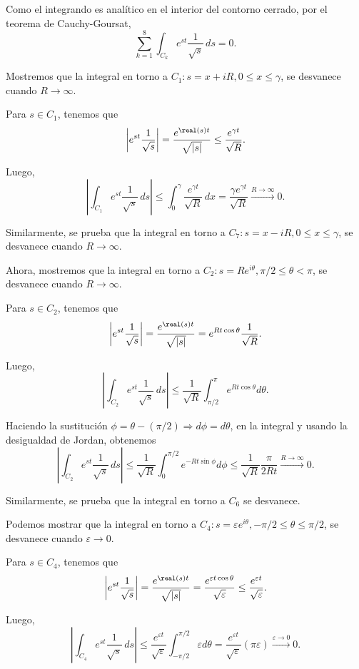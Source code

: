 \begin{ejemplo}
    Como el integrando es analítico en el interior del contorno cerrado, por el teorema de Cauchy-Goursat,
    $$\sum_{k=1}^{8} \int_{C_k} e^{st} \frac{1}{\sqrt{s}} \,ds = 0.$$

    Mostremos que la integral en torno a $C_1: s = x + i R, 0\leq x \leq \gamma$, se desvanece cuando $R \to \infty$. 

    Para $s \in C_1$, tenemos que
    $$\left|e^{st} \frac{1}{\sqrt{s}} \right| = \frac{e^{\real(s) t}}{\sqrt{|s|}} \leq \frac{e^{\gamma t}}{\sqrt{R}}.$$

    Luego,
    $$\left|\int_{C_1} e^{st} \frac{1}{\sqrt{s}} \,ds \right| \leq \int_0^{\gamma} \frac{e^{\gamma t}}{\sqrt{R}} \,dx = \frac{\gamma e^{\gamma t}}{\sqrt{R}} \overset{R \to \infty}{\longrightarrow} 0.$$

    Similarmente, se prueba que la integral en torno a $C_7: s = x - i R, 0 \leq x \leq \gamma$, se desvanece cuando $R \to \infty$.

    Ahora, mostremos que la integral en torno a $C_2: s = Re^{i\theta}, \pi/2 \leq \theta < \pi$, se desvanece cuando $R \to \infty$. 

     Para $s \in C_2$, tenemos que
    $$\left|e^{st} \frac{1}{\sqrt{s}} \right| = \frac{e^{\real(s) t}}{\sqrt{|s|}} = e^{R t \cos \theta }\frac{1}{\sqrt{R}}.$$

    Luego,
    $$\left|\int_{C_2} e^{st} \frac{1}{\sqrt{s}} \,ds \right| \leq \frac{1}{\sqrt{R}} \int_{\pi/2}^{\pi} e^{Rt \cos \theta} d\theta.$$

    Haciendo la sustitución $\phi = \theta - (\pi/2) \Rightarrow d\phi = d\theta$, en la integral y usando la desigualdad de Jordan, obtenemos
    $$\left|\int_{C_2} e^{st} \frac{1}{\sqrt{s}} \,ds \right| \leq \frac{1}{\sqrt{R}} \int_{0}^{\pi/2} e^{-Rt \sin \phi} d\phi \leq \frac{1}{\sqrt{R}} \frac{\pi}{2 R t}\overset{R \to \infty}{\longrightarrow} 0.$$

    Similarmente, se prueba que la integral en torno a $C_6$ se desvanece.

    Podemos mostrar que la integral en torno a $C_4: s = \varepsilon e^{i\theta}, -\pi/2 \leq \theta \leq \pi/2$, se desvanece cuando $\varepsilon \to 0$.

    Para $s \in C_4$, tenemos que
    $$\left|e^{st} \frac{1}{\sqrt{s}} \right| = \frac{e^{\real(s) t}}{\sqrt{|s|}} = \frac{e^{\varepsilon t \cos\theta}}{\sqrt{\varepsilon}} \leq  \frac{e^{\varepsilon t}}{\sqrt{\varepsilon}}.$$

    Luego,
    $$\left|\int_{C_4} e^{st} \frac{1}{\sqrt{s}} \,ds \right| \leq \frac{e^{\varepsilon t}}{\sqrt{\varepsilon}} \int_{-\pi/2}^{ \pi/2} \varepsilon d\theta = \frac{e^{\varepsilon t}}{\sqrt{\varepsilon}} (\pi \varepsilon) \overset{\varepsilon \to 0}{\longrightarrow} 0.$$


\end{ejemplo}
